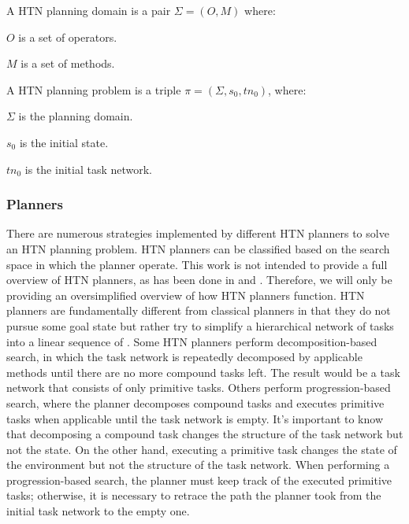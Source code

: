 \begin{Tdef}
    A  HTN planning domain is a pair $\Sigma= (O, M)$ where:
    \vspace{-0.5em}
    \begin{compactitem}
    \item 
    $O$ is a set of operators.
    \item 
    $M$ is a set of methods.
    \end{compactitem}
\end{Tdef}

\begin{Tdef}
    A HTN planning problem is a triple $\pi = (\Sigma,s_0,tn_0)$, where:
    \vspace{-0.5em}
    \begin{compactitem}
    \item 
    $\Sigma$ is the planning domain.
    \item 
    $s_0$ is the initial state.
    \item 
    $tn_0$ is the initial task network.
    \end{compactitem}
\end{Tdef}

\subsubsection{Planners}
There are numerous strategies implemented by different HTN planners to solve an HTN planning problem. HTN planners can be classified based on the search space in which the planner operate. This work is not intended to provide a full overview of HTN planners, as has been done in \cite{bercher_survey_2019} and \cite{OverviewHierarchicalTaskgeorgievski2014}. Therefore, we will only be providing an oversimplified overview of how HTN planners function. HTN planners are fundamentally different from classical planners in that they do not pursue some goal state but rather try to simplify a hierarchical network of tasks into a linear sequence of . Some HTN planners perform decomposition-based search, in which the task network is repeatedly decomposed by applicable methods until there are no more compound tasks left. The result would be a task network that consists of only primitive tasks. Others perform progression-based search, where the planner decomposes compound tasks and executes primitive tasks when applicable until the task network is empty. It's important to know that decomposing a compound task changes the structure of the task network but not the state. On the other hand, executing a primitive task changes the state of the environment but not the structure of the task network. When performing a progression-based search, the planner must keep track of the executed primitive tasks; otherwise, it is necessary to retrace the path the planner took from the initial task network to the empty one.


